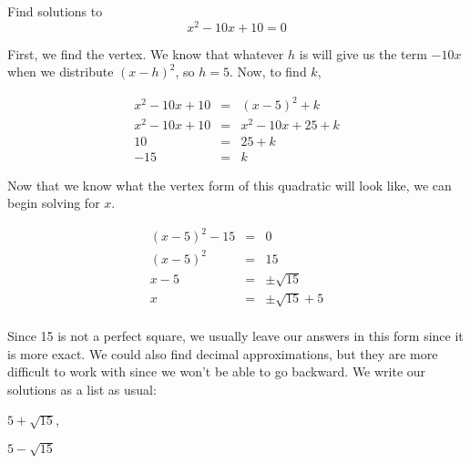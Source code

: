 \begin{example}
Find solutions to
$$x^2 - 10x + 10 = 0$$

First, we find the vertex.  We know that whatever $h$ is will give us the term $-10x$ when we distribute $(x - h)^2$, so $h = 5$.  Now, to find $k$, 

$$\begin{array}{rcl}
x^2 - 10x + 10  & = & (x - 5)^2 + k\\
x^2 - 10x + 10  & = & x^2 - 10x + 25 + k \\ 
10  & = & 25 + k \\ 
-15  & = & k
\end{array}$$

Now that we know what the vertex form of this quadratic will look like, we can begin solving for $x$.

$$\begin{array}{rcl}
(x - 5)^2 - 15 & = & 0 \\
(x - 5)^2 & = & 15 \\
x - 5 & = & \pm \sqrt{15} \\
x & = & \pm \sqrt{15} + 5\\
\end{array}$$

Since 15 is not a perfect square, we usually leave our answers in this form since it is more exact.  We could also find decimal approximations, but they are more difficult to work with since we won't be able to go backward.  We write our solutions as a list as usual:

$5 + \sqrt{15}$, 

$5 - \sqrt{15}$

\end{example}